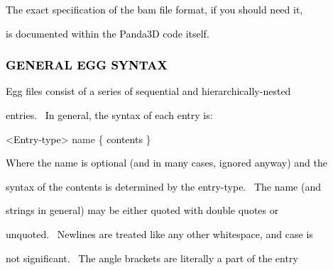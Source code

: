 \documentclass[a4paper]{article}
\newcommand\textstyleOOoComputerKeyWord[1]{\textrm{\textcolor[rgb]{0.0,0.0,0.5019608}{#1}}}
\newcommand\textstyleOOoAssemblerSpecialChar[1]{\textrm{\textcolor[rgb]{0.0,0.5019608,0.0}{#1}}}
\newcommand\textstyleOOoAssemblerIdent[1]{\textrm{\textcolor{black}{#1}}}
\newcommand\textstyleOOoAssemblerDirective[1]{\textrm{\textcolor[rgb]{0.0,0.5019608,1.0}{#1}}}
\begin{document}
{\color{black}
\textstyleOOoComputerKeyWord{\textcolor{black}{The exact specification of the bam file format, if you should need it,}}}

{\color{black}
\textstyleOOoComputerKeyWord{\textcolor{black}{is documented within the Panda3D code itself.}}}


\bigskip


\bigskip

\subsubsection[GENERAL EGG SYNTAX]{\textstyleOOoComputerKeyWord{\textcolor{black}{GENERAL EGG SYNTAX}}}
\hypertarget{RefHeading7672869075401}{}
\bigskip

{\color{black}
\textstyleOOoComputerKeyWord{\textcolor{black}{Egg files consist of a series of sequential and hierarchically-nested}}}

{\color{black}
\textstyleOOoComputerKeyWord{\textcolor{black}{entries. \ In general, the syntax of each entry is:}}}


\bigskip

{\color{black}
\textstyleOOoAssemblerSpecialChar{{\textless}}\textstyleOOoAssemblerIdent{Entry}\textstyleOOoAssemblerSpecialChar{{}-}\textstyleOOoAssemblerIdent{type}\textstyleOOoAssemblerSpecialChar{{\textgreater}}\textstyleOOoComputerKeyWord{\textcolor{black}{
}}\textstyleOOoAssemblerDirective{name}\textstyleOOoComputerKeyWord{\textcolor{black}{
}}\textstyleOOoAssemblerSpecialChar{\{}\textstyleOOoComputerKeyWord{\textcolor{black}{
}}\textstyleOOoAssemblerIdent{contents}\textstyleOOoComputerKeyWord{\textcolor{black}{
}}\textstyleOOoAssemblerSpecialChar{\}}}


\bigskip

{\color{black}
\textstyleOOoComputerKeyWord{\textcolor{black}{Where the name is optional (and in many cases, ignored anyway) and the}}}

{\color{black}
\textstyleOOoComputerKeyWord{\textcolor{black}{syntax of the contents is determined by the entry-type. \ The name
(and}}}

{\color{black}
\textstyleOOoComputerKeyWord{\textcolor{black}{strings in general) may be either quoted with double quotes or}}}

{\color{black}
\textstyleOOoComputerKeyWord{\textcolor{black}{unquoted. \ Newlines are treated like any other whitespace, and case
is}}}

{\color{black}
\textstyleOOoComputerKeyWord{\textcolor{black}{not significant. \ The angle brackets are literally a part of the
entry}}}
\end{document}
